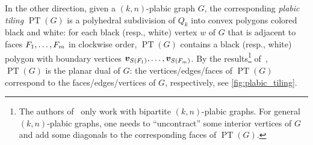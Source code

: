 \documentclass[11pt]{amsart}
\theoremstyle{plain}
\theoremstyle{definition}
\def\v{{\bm{v}}}
\def\PT{\operatorname{PT}}
\begin{document}
In the other direction, 
given a $(k,n)$-plabic graph $G$, the corresponding \emph{plabic tiling} $\PT(G)$ 
is a polyhedral subdivision of $Q_k$ into convex polygons colored black and white: 
for each black (resp., white) vertex $w$ of $G$ that is adjacent to faces $F_1,\dots,F_m$ in clockwise order, $\PT(G)$ contains a black (resp., white) polygon with boundary vertices $\v_{\fl{\face_1}},\dots,\v_{\fl{\face_m}}$. By the results\footnote{The authors of~\cite{OPS} only work with bipartite $(k,n)$-plabic graphs. For general $(k,n)$-plabic graphs, one needs to ``uncontract'' some interior vertices of $G$ and add some diagonals to the corresponding faces of $\PT(G)$.} of~\cite{OPS}, $\PT(G)$ is the planar dual of $G$: the vertices/edges/faces of $\PT(G)$ correspond to the faces/edges/vertices of $G$, respectively, see \cref{fig:plabic_tiling}.


\def\Scomma{}
\def\ScommaEmpty{\emptyset}
\end{document}
